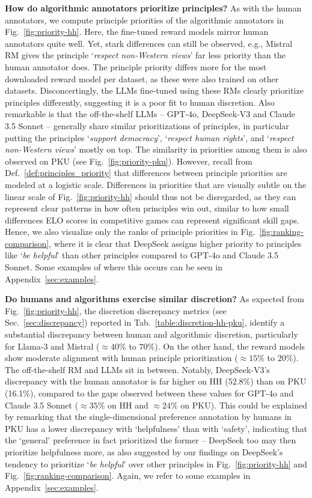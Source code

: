 \documentclass{article}
\begin{document}
\noindent\textbf{How do algorithmic annotators prioritize principles?} As with the human annotators, we compute principle priorities of the algorithmic annotators in Fig.~\ref{fig:priority-hh}. Here, the fine-tuned reward models mirror human annotators quite well. Yet, stark differences can still be observed, e.g., Mistral RM gives the principle `\textit{respect non-Western views}' far less priority than the human annotator does. The principle priority differs more for the most downloaded reward model per dataset, as these were also trained on other datasets. Disconcertingly, the LLMs fine-tuned using these RMs clearly prioritize principles differently, suggesting it is a poor fit to human discretion. Also remarkable is that the off-the-shelf LLMs -- GPT-4o, DeepSeek-V3 and Claude 3.5 Sonnet -- generally share similar prioritizations of principles, in particular putting the principles `\textit{support democracy}', `\textit{respect human rights}', and `\textit{respect non-Western views}' mostly on top. The similarity in priorities among them is also observed on PKU (see Fig.~\ref{fig:priority-pku}). However, recall from Def.~\ref{def:principles_priority} that differences between principle priorities are modeled at a logistic scale. Differences in priorities that are visually subtle on the linear scale of Fig.~\ref{fig:priority-hh} should thus not be disregarded, as they can represent clear patterns in how often principles win out, similar to how small differences ELO scores in competitive games can represent significant skill gaps. Hence, we also visualize only the ranks of principle priorities in Fig.~\ref{fig:ranking-comparison}, where it is clear that DeepSeek assigns higher priority to principles like `\textit{be helpful}' than other principles compared to GPT-4o and Claude 3.5 Sonnet. 
Some examples of where this occurs can be seen in Appendix~\ref{sec:examples}.


\noindent\textbf{Do humans and algorithms exercise similar discretion?}
As expected from Fig.~\ref{fig:priority-hh}, the discretion discrepancy metrics (see Sec.~\ref{sec:discrepancy}) reported in Tab.~\ref{table:discretion-hh-pku}, identify a substantial discrepancy between human and algorithmic discretion, particularly for Llama-3 and Mistral ($\approx 40\%$ to $70\%$). On the other hand, the reward models show moderate alignment with human principle prioritization ($\approx 15\%$ to $20\%$). The off-the-shelf RM and LLMs sit in between. Notably, DeepSeek-V3's discrepancy with the human annotator is far higher on HH (52.8\%) than on PKU (16.1\%), compared to the gaps observed between these values for GPT-4o and Claude 3.5 Sonnet ($\approx 35\%$ on HH and $\approx 24\%$ on PKU). This could be explained by remarking that the single-dimensional preference annotation by humans in PKU has a lower discrepancy with `helpfulness' than with `safety', indicating that the `general' preference in fact prioritized the former -- DeepSeek too may then prioritize helpfulness more, as also suggested by our findings on  DeepSeek's tendency to prioritize `\textit{be helpful}' over other principles in Fig.~\ref{fig:priority-hh} and Fig.~\ref{fig:ranking-comparison}. Again, we refer to some examples in Appendix~\ref{sec:examples}.
\end{document}
